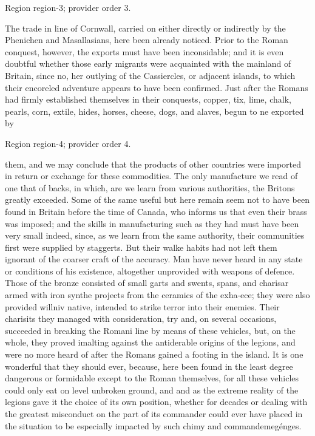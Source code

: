 \documentclass[11pt]{article}
\begin{document}
{\scriptsize\color{gray} Region region-3; provider order 3.\par}
\medskip

The trade in line of Cornwall, carried on either directly or indirectly by the Phenichen and Masallasians, here been already noticed. Prior to the Roman conquest, however, the exports must have been inconsidable; and it is even doubtful whether those early migrants were acquainted with the mainland of Britain, since no, her outlying of the Cassiercles, or adjacent islands, to which their encoreled adventure appears to have been confirmed. Just after the Romans had firmly established themselves in their conquests, copper, tix, lime, chalk, pearls, corn, extile, hides, horses, cheese, dogs, and alaves, begun to ne exported by
\par

{\scriptsize\color{gray} Region region-4; provider order 4.\par}
\medskip

them, and we may conclude that the products of other countries were imported in return or exchange for these commodities. The only manufacture we read of one that of backs, in which, are we learn from various authorities, the Britons greatly exceeded. Some of the same useful but here remain seem not to have been found in Britain before the time of Canada, who informs us that even their brass was imposed; and the skills in manufacturing such as they had must have been very small indeed, since, as we learn from the same authority, their communities first were supplied by staggerts. But their walke habits had not left them ignorant of the coarser craft of the accuracy. Man have never heard in any state or conditions of his existence, altogether unprovided with weapons of defence. Those of the bronze consisted of small garts and swents, spans, and charisar armed with iron synthe projects from the ceramics of the exha-ece; they were also provided willniv native, intended to strike terror into their enemies. Their charisits they managed with consideration, try and, on several occasions, succeeded in breaking the Romani line by means of these vehicles, but, on the whole, they proved imalting against the antiderable origins of the legions, and were no more heard of after the Romans gained a footing in the island. It is one wonderful that they should ever, because, here been found in the least degree dangerous or formidable except to the Roman themselves, for all these vehicles could only eat on level unbroken ground, and and as the extreme reality of the legions gave it the choice of its own position, whether for decades or dealing with the greatest misconduct on the part of its commander could ever have placed in the situation to be especially impacted by such chimy and commandemegénges.
\par
\end{document}
